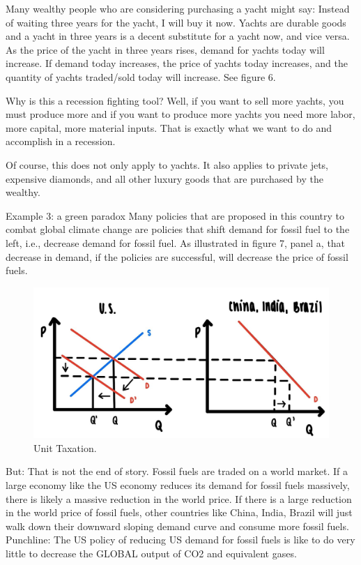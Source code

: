 \documentclass[
]{book}
\begin{document}
Many wealthy people who are considering purchasing a yacht might say: Instead of waiting three years for the yacht, I will buy it now. Yachts are durable goods and a yacht in three years is a decent substitute for a yacht now, and vice versa. As the price of the yacht in three years rises, demand for yachts today will increase. If demand today increases, the price of yachts today increases, and the quantity of yachts traded/sold today will increase. See figure 6.

Why is this a recession fighting tool? Well, if you want to sell more yachts, you must produce more and if you want to produce more yachts you need more labor, more capital, more material inputs. That is exactly what we want to do and accomplish in a recession.

Of course, this does not only apply to yachts. It also applies to private jets, expensive diamonds, and all other luxury goods that are purchased by the wealthy.

Example 3: a green paradox
Many policies that are proposed in this country to combat global climate change are policies that shift demand for fossil fuel to the left, i.e., decrease demand for fossil fuel. As illustrated in figure 7, panel a, that decrease in demand, if the policies are successful, will decrease the price of fossil fuels.

\begin{figure}

{\centering \includegraphics[width=0.5\linewidth]{img/compmarkets/fig7} 

}

\caption{Unit Taxation.}\label{fig:compmarkets07}
\end{figure}

But: That is not the end of story. Fossil fuels are traded on a world market. If a large economy like the US economy reduces its demand for fossil fuels massively, there is likely a massive reduction in the world price. If there is a large reduction in the world price of fossil fuels, other countries like China, India, Brazil will just walk down their downward sloping demand curve and consume more fossil fuels.
Punchline: The US policy of reducing US demand for fossil fuels is like to do very little to decrease the GLOBAL output of CO2 and equivalent gases.
\end{document}
